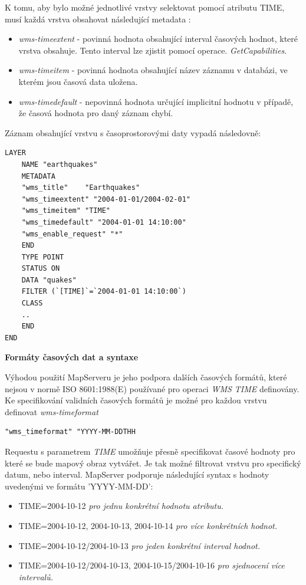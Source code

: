 K tomu, aby bylo možné jednotlivé vrstvy selektovat pomocí atributu TIME, musí každá vrstva obsahovat následující metadata \cite{mapserver_about}:

\begin{itemize}
	\item\textit{wms-timeextent} - povinná hodnota obsahující interval časových hodnot, které vrstva obsahuje. Tento interval lze zjistit pomocí operace. \textit{GetCapabilities}.
	\item\textit{wms-timeitem} - povinná hodnota obsahující název záznamu v databázi, ve kterém jsou časová data uložena.  
	\item\textit{wms-timedefault} - nepovinná hodnota určující implicitní hodnotu v případě, že časová hodnota pro daný záznam chybí.   
\end{itemize}

\noindent
Záznam obsahující vrstvu s časoprostorovými daty vypadá následovně:

\begin{verbatim}
LAYER
	NAME "earthquakes"
	METADATA
	"wms_title"    "Earthquakes"
	"wms_timeextent" "2004-01-01/2004-02-01"
	"wms_timeitem" "TIME"
	"wms_timedefault" "2004-01-01 14:10:00"
	"wms_enable_request" "*"
	END
	TYPE POINT
	STATUS ON
	DATA "quakes"
	FILTER (`[TIME]`=`2004-01-01 14:10:00`)
	CLASS
	..
	END
END
\end{verbatim}

\bigskip
\noindent
\textbf{Formáty časových dat a syntaxe}

Výhodou použití MapServeru je jeho podpora dalších časových formátů, které nejsou v normě ISO 8601:1988(E) používané pro operaci \textit{WMS TIME} definovány. Ke specifikování validních časových formátů je možné pro každou vrstvu definovat \textit{wms-timeformat}

\begin{verbatim}
"wms_timeformat" "YYYY-MM-DDTHH
\end{verbatim}

Requestu s parametrem \textit{TIME} umožňuje přesně specifikovat časové hodnoty pro které se bude mapový obraz vytvářet. Je tak možné filtrovat vrstvu pro specifický datum, nebo interval. MapServer podporuje následující syntax s hodnoty uvedenými ve formátu 'YYYY-MM-DD':

\begin{itemize}
	\item TIME=2004-10-12 \textit{pro jednu konkrétní hodnotu atributu.}
	\item TIME=2004-10-12, 2004-10-13, 2004-10-14 \textit{pro více konkrétních hodnot.}
	\item TIME=2004-10-12/2004-10-13 \textit{pro jeden konkrétní interval hodnot.}
	\item TIME=2004-10-12/2004-10-13, 2004-10-15/2004-10-16 \textit{pro sjednocení více intervalů.}
\end{itemize}


